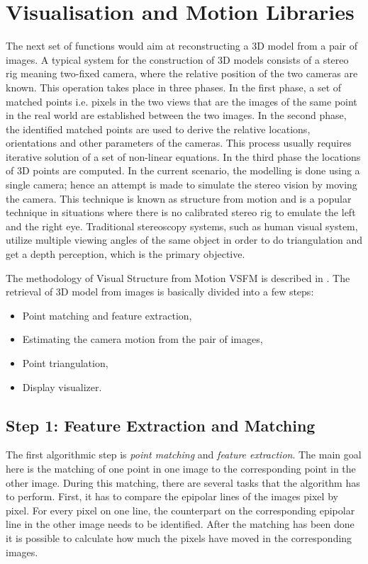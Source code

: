 \section{Visualisation and Motion Libraries}
\label{sec:Wireframe}
The next set of functions would aim at reconstructing a 3D model from a pair of images.
A typical system for the construction of 3D models consists of a stereo rig meaning two-fixed camera, where the relative position of the two cameras are known.
 This operation takes place in three phases. In the
first phase, a set of matched points i.e. pixels in the
two views that are the images of the same point in the
real world are established between the two images.
In the second phase, the identified matched points are
used to derive the relative locations, orientations and
other parameters of the cameras. This process usually
requires iterative solution of a set of non-linear equations. In the third phase the locations of 3D points are
computed. In the current scenario, the modelling is done using a single camera; hence an attempt is made to simulate the stereo vision by moving the camera. This technique is known as structure from motion and is a popular technique in situations where there is no calibrated stereo rig to emulate the left and the right eye. Traditional stereoscopy systems, such as human visual system, utilize multiple viewing angles of the same object in order to do triangulation and get a depth perception, which is the primary objective.


The methodology of Visual Structure
from Motion VSFM is described in \cite{wu2011visualsfm,triggs2000bundle}. The retrieval of 3D model from images is basically divided into a few steps:
\begin{itemize}
\item Point matching and feature extraction,
\item Estimating the camera motion from the pair of images,
\item Point triangulation,
\item Display visualizer.
\end{itemize}

\subsection{Step 1: Feature Extraction and Matching}
The first algorithmic step is \textit{point matching} and \textit{feature extraction}. The main goal here is the matching of one point in one image to the corresponding
point in the other image. During this matching, there are several tasks that the algorithm has to perform.
First, it has to compare the epipolar lines of the images pixel by pixel. For every pixel on one line, the counterpart on the corresponding epipolar line in the other image needs to be identified. After the matching has been done it is possible to calculate how much the pixels have moved in the corresponding images. 

